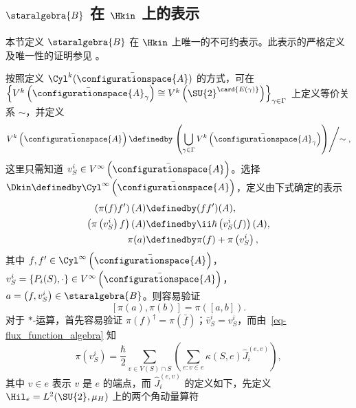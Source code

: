 		\subsection{\texorpdfstring{$\staralgebra{B}$ 在 $\Hkin$ 上的表示}{B 在希尔伯特空间 H 上的表示}}

			本节定义 $\staralgebra{B}$ 在 $\Hkin$ 上唯一的不可约表示。此表示的严格定义及唯一性的证明参见 \cite{Thiemann2007}。

			按照定义 $\Cyl^k(\bar{\configurationspace{A}})$ 的方式，可在 $\left\{ V^k\left(\bar{\configurationspace{A}}_\gamma\right) \cong V^k\left(\SU{2}^{\card{E(\gamma)}}\right) \right\}_{\gamma\in \Gamma}$ 上定义等价关系 $\sim$，并定义
			\begin{equation}
				V^k\left( \bar{\configurationspace{A}} \right) \definedby \left. \left( \bigcup_{\gamma\in \Gamma} V^k\left( \bar{\configurationspace{A}}_\gamma \right) \right) \middle/ \sim \right. ,
			\end{equation}
			这里只需知道 $v^i_S \in V^\infty\left( \bar{\configurationspace{A}} \right)$。选择 $\Dkin \definedby \Cyl^\infty \left( \bar{\configurationspace{A}} \right)$，定义由下式确定的表示
			\begin{equation}
				\begin{split}
					\left( \pi(f)f' \right)(A) &\definedby (f f')(A),\\
					\left( \pi\left(v^i_S\right) f \right)(A) &\definedby \ii\hbar \left( v^i_S(f) \right)(A),\\
					\pi(a) &\definedby \pi(f) + \pi\left(v^i_S\right),
				\end{split}
			\end{equation}
			其中 $f,f'\in \Cyl^\infty\left(\bar{\configurationspace{A}}\right)$，$v^i_S = \left\{ P_i(S), \cdot \right\} \in V^\infty \left( \bar{\configurationspace{A}} \right)$，$a=\left( f, v^i_S \right) \in \staralgebra{B}$。则容易验证
			\begin{equation}
				\left[ \pi(a), \pi(b) \right] = \pi\left( \left[ a,b \right] \right).
			\end{equation}
			对于 $*$-运算，首先容易验证 $\pi(f)^\dagger = \pi(\bar{f})$；$\bar{v}^i_S = v^i_S$，而由~\eqref{eq-flux_function_algebra} 知
			\begin{equation}
				\pi\left(v^i_S\right) = \frac{\hbar}{2} \sum_{v\in V(S) \cap S} \left( \sum_{e:v\in e} \kappa(S,e) \hat{J}^{(e,v)}_i \right),\label{eq-flux_operator}
			\end{equation}
			其中 $v\in e$ 表示 $v$ 是 $e$ 的端点，而 $\hat{J}^{(e,v)}_i$ 的定义如下，先定义 $\Hil_e = L^2(\SU{2},\mu_H)$ 上的两个角动量算符
